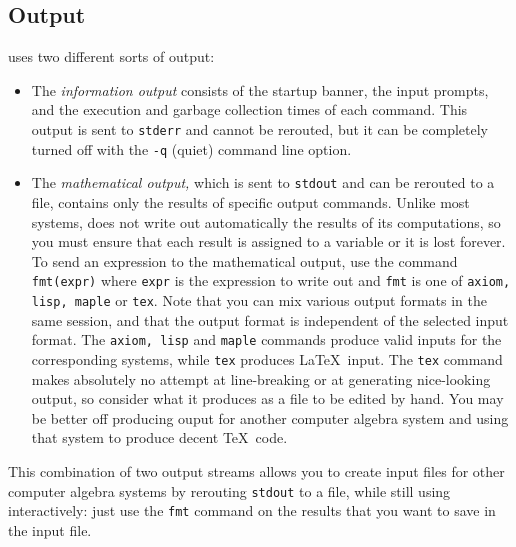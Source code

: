 \subsection{Output}
\shasta{} uses two different sorts of output:
\begin{itemize}
\item
The {\em information output} consists of the startup banner,
the input prompts, and the execution and garbage collection
times of each command.
This output is sent to {\tt stderr} and cannot be rerouted,
but it can be completely turned off
with the {\tt -q} (quiet) command line option.
\item
The {\em mathematical output,\/} which is sent to {\tt stdout} and can
be rerouted to a file, contains only the results of specific output commands.
Unlike most systems, \shasta{} does not write out automatically the results
of its computations, so you must ensure that each result is assigned to a
variable or it is lost forever. To send an expression to the mathematical
output, use the command {\tt fmt(expr)} where {\tt expr} is the expression to
write out and {\tt fmt} is one of {\tt axiom, lisp, maple} or {\tt tex}.
Note that you
can mix various output formats in the same session, and that the output
format is independent of the selected input format. The {\tt axiom, lisp}
and {\tt maple} commands produce valid inputs for the corresponding systems,
while {\tt tex} produces \LaTeX~input. The {\tt tex} command makes absolutely
no attempt at line-breaking or at generating nice-looking output, so consider
what it produces as a file to be edited by hand. You may be better off
producing ouput for another computer algebra system and using that system
to produce decent \TeX~code.
\end{itemize}
This combination of two output streams allows you to create input files
for other computer algebra systems by rerouting {\tt stdout} to a file,
while still using \shasta{} interactively: just use the {\tt fmt} command
on the results that you want to save in the input file.
